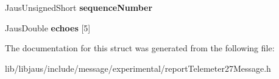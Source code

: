 \begin{DoxyCompactItemize}
\item 
\hypertarget{struct_report_telemeter27_message_struct_a3a4ec2cec6ad3ab7a910906b08b72bcc}{\-Jaus\-Unsigned\-Short {\bfseries sequence\-Number}}\label{struct_report_telemeter27_message_struct_a3a4ec2cec6ad3ab7a910906b08b72bcc}

\item 
\hypertarget{struct_report_telemeter27_message_struct_a4b26d6c8a83777b580c087ebfc6d5f85}{\-Jaus\-Double {\bfseries echoes} \mbox{[}5\mbox{]}}\label{struct_report_telemeter27_message_struct_a4b26d6c8a83777b580c087ebfc6d5f85}

\end{DoxyCompactItemize}


\-The documentation for this struct was generated from the following file\-:\begin{DoxyCompactItemize}
\item 
lib/libjaus/include/message/experimental/report\-Telemeter27\-Message.\-h\end{DoxyCompactItemize}
